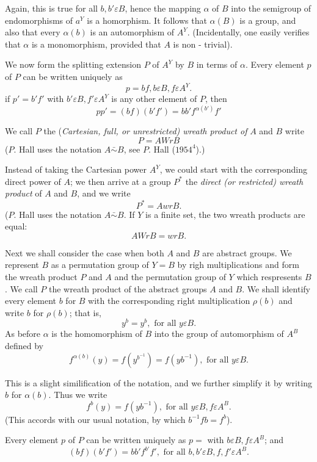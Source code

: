 Again, this is true for all $b, b' \varepsilon B$, hence the mapping
$\alpha$ of $B$ into the semigroup of endomorphisms of $a^Y$ is a
homorphism. It follows that $\alpha(B)$ is a group, and also that
every $\alpha(b)$ is an automorphism of $A^Y$. (Incidentally, one
easily verifies that $\alpha$ is a monomorphism, provided that $A$ is
non - trivial). 

We now form the splitting extension $P$ of $A^Y$ by $B$ in terms of
$\alpha$. Every element $p$ of $P$ can be written uniquely as  
$$
p = bf,  b \varepsilon B, f \varepsilon A^Y.
$$
if $p' = b' f'$ with $b' \varepsilon B, f' \varepsilon A^Y$ is any
other element of $P$, then 
$$
pp' = (bf)(b'f') = bb' f^{\alpha(b')}f'
$$

We call $P$ the (\textit{Cartesian, full, or unrestricted) wreath
  product of } $A $ and $B$ write 
$$
P = A Wr B
$$
($P$. Hall uses the notation $A \bar{\sim}B$, see $P$. Hall
($1954^4$).) 

Instead of taking the Cartesian power $A^Y$, we could start with the
corresponding direct power of $A$; we then arrive at a group $P^*$ the
\textit{direct (or restricted) wreath product} of $A$ and $B$, and we
write 
$$
P ^*= A wr B.
$$
($P$. Hall uses the notation $A \bar{\sim} B$. If $Y$ is a finite set,
the two wreath products are equal: 
$$
A Wr B = wr B.
$$

Next we shall consider the case when both $A$ and $B$ are abstract
groups. We represent $B$ as a permutation group of $Y = B$ by righ
multiplications and form the wreath product $P$ and $A$ and the
permutation group of $Y$ which respresents $B$. We call $P$ the wreath
product of the abstract groups $A$ and $B$. We shall identify	every
element $b$ for $B$ with the corresponding right multiplication
$\rho(b)$ and write $b$ for $\rho(b)$; that is, 
$$
y^b = y^b,   \text{   for all   } y \varepsilon B.
$$
As before $\alpha$ is the homomorphism of $B$ into the group of
automorphism of $A^B$ defined by 
$$
f^{\alpha(b)}(y) = f(y^{b^{-1}}) = f(yb^{-1}), \text{ for all }y
\varepsilon B. 
$$

This is a slight similification of the notation, and we further
simplify it by writing $b$ for $\alpha(b)$. Thus we write 
$$
f^b(y) = f(yb^{-1}), \text{  for all  }y \varepsilon B, f \varepsilon A^B.
$$
(This accords with our usual notation, by which $b^{-1}f b = f^b$).

Every element $p$ of $P$ can be written uniquely as $p =$ with $b
\varepsilon B,  f \varepsilon A^B$; and  
$$
(bf) (b' f') = bb' f^{b'} f', \text{ for all } b,b' \varepsilon B,
f,f' \varepsilon A^B. 
$$

